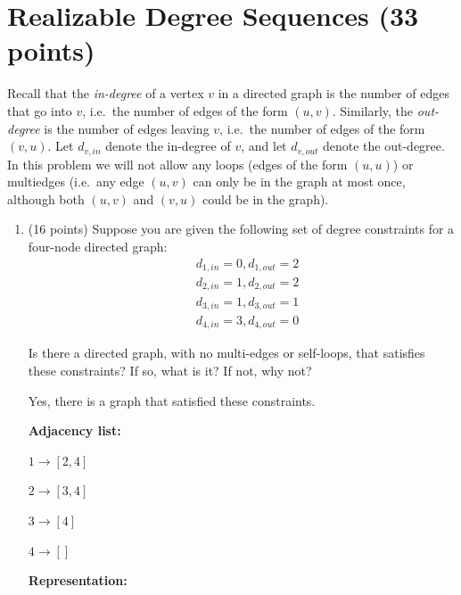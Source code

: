 \documentclass[11pt]{article}
\begin{document}
\section{Realizable Degree Sequences (33 points)}

Recall that the \emph{in-degree} of a vertex $v$ in a directed graph is the number of edges that go into $v$, i.e.~the number of edges of the form $(u,v)$. 
Similarly, the \emph{out-degree} is the number of edges leaving $v$, i.e.~the number of edges of the form $(v,u)$. Let $d_{v,in}$ denote the 
in-degree of $v$, and let $d_{v,out}$ denote the out-degree. In this problem we will not allow any loops (edges of the form $(u,u)$) 
or multiedges (i.e.~any edge $(u,v)$ can only be in the graph at most once, although both $(u,v)$ and $(v,u)$ could be in the graph).

\begin{enumerate}
\item  (16 points)
Suppose you are given the following set of degree constraints for a four-node directed graph:
\begin{align*}
&d_{1,in} = 0, d_{1,out} = 2 \\
&d_{2,in} = 1, d_{2,out} = 2 \\
&d_{3,in} = 1, d_{3,out} = 1 \\
&d_{4,in} = 3, d_{4,out} = 0
\end{align*}

Is there a directed graph, with no multi-edges or self-loops, that satisfies these constraints?  If so, what is it?  If not, why not?

\bigbreak

Yes, there is a graph that satisfied these constraints.

\medbreak

\textbf{Adjacency list:}

$1 \rightarrow [2, 4]$

$2 \rightarrow [3, 4]$

$3 \rightarrow [4]$

$4 \rightarrow []$

\medbreak

\textbf{Representation:}



\end{enumerate}
\end{document}
